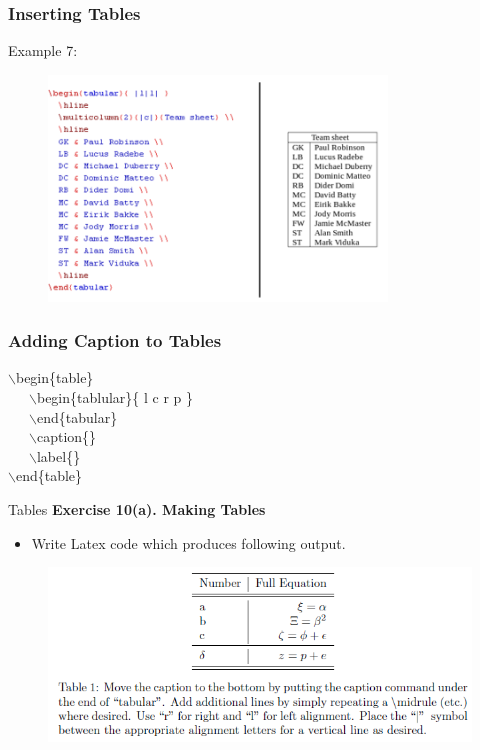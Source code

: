 \documentclass [9pt] {beamer}
\begin{document}
\begin{frame}\frametitle{Inserting Tables}
\rm
\fontsize{9pt}{11pt}\selectfont
Example 7:
\begin{figure}
\includegraphics[height=6cm]{tb7.png}
\end{figure}

\end{frame}

\begin{frame}\frametitle{Adding Caption to Tables}
\rm
\fontsize{9pt}{11pt}\selectfont
{\color{blue}$\backslash$begin\{table\} } \\[.30cm]
\  \  \ {\color{green}$\backslash$begin\{tablular\}\{ l c r p \}\\[.30cm]
\  \  \ $\backslash$end\{tabular\}  }\\[.30cm]
\  \  \ {\color{red}$\backslash$caption\{\}\\[.30cm]
\  \  \ $\backslash$label\{\}}\\[.30cm]
{\color{blue}$\backslash$end\{table\}}


\end{frame}

\begin{frame}{Tables}
\textbf{Exercise 10(a). Making Tables}\\[.30cm]
\begin{itemize}
	\item Write Latex code which produces following output.
\end{itemize}
\begin{figure}
	\centering
	\includegraphics[width=\linewidth]{Ex8}
	
	\label{fig:ex8}
\end{figure}
\end{frame}
\end{document}
